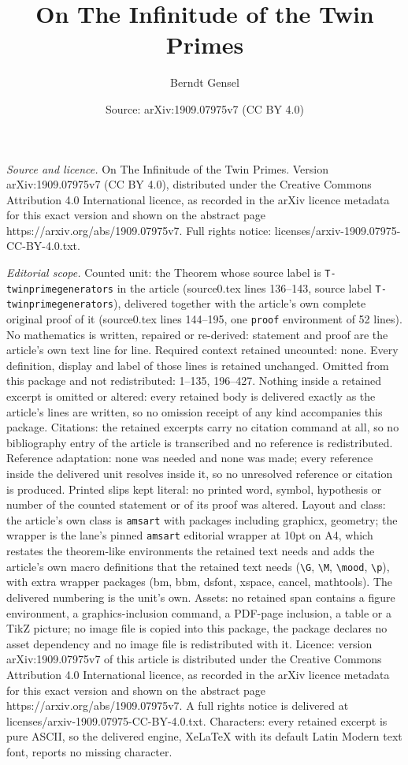 \documentclass[10pt,a4paper]{amsart}
\title[On The Infinitude of the Twin Primes]{On The Infinitude of the Twin Primes}
\author{Berndt Gensel}
\date{Source: arXiv:1909.07975v7 (CC BY 4.0)}
\begin{document}
\maketitle

\noindent\emph{Source and licence.} On The Infinitude of the Twin Primes. Version arXiv:1909.07975v7 (CC BY 4.0), distributed under the Creative Commons Attribution 4.0 International licence, as recorded in the arXiv licence metadata for this exact version and shown on the abstract page https://arxiv.org/abs/1909.07975v7. Full rights notice: licenses/arxiv-1909.07975-CC-BY-4.0.txt.\par\smallskip

\noindent\textit{Editorial scope.} Counted unit: the Theorem whose source label is \texttt{T-twinprimegenerators} in the article (source0.tex lines 136--143, source label \texttt{T-twinprimegenerators}), delivered together with the article's own complete original proof of it (source0.tex lines 144--195, one \texttt{proof} environment of 52 lines). No mathematics is written, repaired or re-derived: statement and proof are the article's own text line for line. Required context retained uncounted: none. Every definition, display and label of those lines is retained unchanged. Omitted from this package and not redistributed: 1--135, 196--427. Nothing inside a retained excerpt is omitted or altered: every retained body is delivered exactly as the article's lines are written, so no omission receipt of any kind accompanies this package. Citations: the retained excerpts carry no citation command at all, so no bibliography entry of the article is transcribed and no reference is redistributed. Reference adaptation: none was needed and none was made; every reference inside the delivered unit resolves inside it, so no unresolved reference or citation is produced. Printed slips kept literal: no printed word, symbol, hypothesis or number of the counted statement or of its proof was altered. Layout and class: the article's own class is \texttt{amsart} with packages including graphicx, geometry; the wrapper is the lane's pinned \texttt{amsart} editorial wrapper at 10pt on A4, which restates the theorem-like environments the retained text needs and adds the article's own macro definitions that the retained text needs (\texttt{\textbackslash G}, \texttt{\textbackslash M}, \texttt{\textbackslash mood}, \texttt{\textbackslash p}), with extra wrapper packages (bm, bbm, dsfont, xspace, cancel, mathtools). The delivered numbering is the unit's own. Assets: no retained span contains a figure environment, a graphics-inclusion command, a PDF-page inclusion, a table or a TikZ picture; no image file is copied into this package, the package declares no asset dependency and no image file is redistributed with it. Licence: version arXiv:1909.07975v7 of this article is distributed under the Creative Commons Attribution 4.0 International licence, as recorded in the arXiv licence metadata for this exact version and shown on the abstract page https://arxiv.org/abs/1909.07975v7. A full rights notice is delivered at licenses/arxiv-1909.07975-CC-BY-4.0.txt. Characters: every retained excerpt is pure ASCII, so the delivered engine, XeLaTeX with its default Latin Modern text font, reports no missing character.
\end{document}

